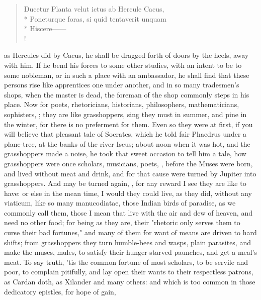 \begin{latin}
\begin{verse}%
Ducetur Planta velut ictus ab Hercule Cacus,\\*
Poneturque foras, si quid tentaverit unquam\\*
Hiscere------\\!
\end{verse}%
\end{latin}
as Hercules did by Cacus, he shall be dragged forth of doors by the heels, away
with him. If he bend his forces to some other studies, with an intent to be
 to some nobleman, or in such a place with an ambassador, he
shall find that these persons rise like apprentices one under another, and in
so many tradesmen's shops, when the master is dead, the foreman of the shop
commonly steps in his place. Now for poets, rhetoricians, historians,
philosophers, mathematicians, sophisters, \etc{}; they are
like grasshoppers, sing they must in summer, and pine in the winter, for there
is no preferment for them. Even so they were at first, if you will believe that
pleasant tale of Socrates, which he told fair Phaedrus under a plane-tree, at
the banks of the river Iseus; about noon when it was hot, and the grasshoppers
made a noise, he took that sweet occasion to tell him a tale, how grasshoppers
were once scholars, musicians, poets, \etc{}, before the Muses were born, and
lived without meat and drink, and for that cause were turned by Jupiter into
grasshoppers. And may be turned again, , for any reward I see they are like to have: or else in the mean time, I
would they could live, as they did, without any viaticum, like so many
manucodiatae, those Indian birds of paradise, as we
commonly call them, those I mean that live with the air and dew of heaven, and
need no other food; for being as they are, their "rhetoric
only serves them to curse their bad fortunes," and many of them for want of
means are driven to hard shifts; from grasshoppers they turn humble-bees and
wasps, plain parasites, and make the muses, mules, to satisfy their
hunger-starved paunches, and get a meal's meat. To say truth, 'tis the common
fortune of most scholars, to be servile and poor, to complain pitifully, and
lay open their wants to their respectless patrons, as
Cardan doth, as Xilander and many
others: and which is too common in those dedicatory epistles, for hope of gain,
